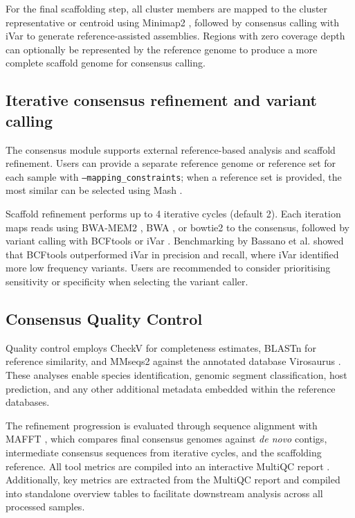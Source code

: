 For the final scaffolding step, all cluster members are mapped to the cluster representative or centroid using Minimap2 \citep{Li2018-gi}, followed by consensus calling with iVar \citep{Grubaugh2019-xd} to generate reference-assisted assemblies. Regions with zero coverage depth can optionally be represented by the reference genome to produce a more complete scaffold genome for consensus calling.

\subsection{Iterative consensus refinement and variant calling}

The consensus module supports external reference-based analysis and scaffold refinement. Users can provide a separate reference genome or reference set for each sample with \texttt{--mapping\_constraints}; when a reference set is provided, the most similar can be selected using Mash \citep{Ondov2019-bo}.

Scaffold refinement performs up to 4 iterative cycles (default 2). Each iteration maps reads using BWA-MEM2 \citep{Vasimuddin2019-rb}, BWA \citep{Li2013-pp}, or bowtie2 \citep{Langmead2019-wx} to the consensus, followed by variant calling with BCFtools \citep{Danecek2021-je} or iVar \citep{Grubaugh2019-xd}. Benchmarking by Bassano et al. \citep{Bassano2022-cl} showed that BCFtools outperformed iVar in precision and recall, where iVar identified more low frequency variants. Users are recommended to consider prioritising sensitivity or specificity when selecting the variant caller.

\subsection{Consensus Quality Control}

Quality control employs CheckV \citep{Nayfach2021-wl} for completeness estimates, BLASTn \citep{Altschul1990-sy} for reference similarity, and MMseqs2 \citep{Steinegger2017-ci} against the annotated database Virosaurus \citep{Gleizes2020-rq}. These analyses enable species identification, genomic segment classification, host prediction, and any other additional metadata embedded within the reference databases.

The refinement progression is evaluated through sequence alignment with MAFFT \citep{Katoh2002-ox}, which compares final consensus genomes against \textit{de novo} contigs, intermediate consensus sequences from iterative cycles, and the scaffolding reference. All tool metrics are compiled into an interactive MultiQC report \citep{Ewels2016-hs}. Additionally, key metrics are extracted from the MultiQC report and compiled into standalone overview tables to facilitate downstream analysis across all processed samples.

